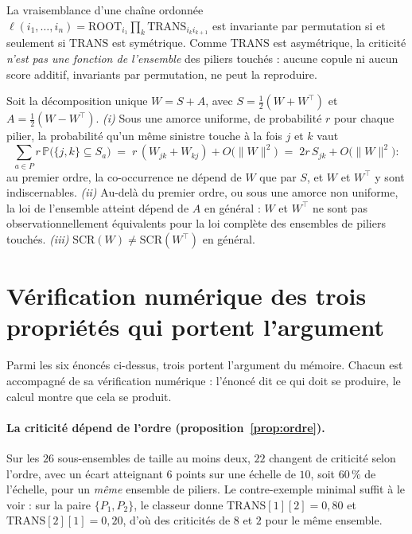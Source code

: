 \begin{proposition}
\label{prop:ordre}
La vraisemblance d'une chaîne ordonnée $\ell(i_1,\dots,i_n)=\mathrm{ROOT}_{i_1}\prod_k
\mathrm{TRANS}_{i_k i_{k+1}}$ est invariante par permutation si et seulement si
$\mathrm{TRANS}$ est symétrique. Comme $\mathrm{TRANS}$ est asymétrique, la criticité
\emph{n'est pas une fonction de l'ensemble} des piliers touchés : aucune copule ni aucun
score additif, invariants par permutation, ne peut la reproduire.
\end{proposition}

\begin{proposition}
\label{prop:nonid}
Soit la décomposition unique $W=S+A$, avec $S=\tfrac12(W+W^\top)$ et $A=\tfrac12(W-W^\top)$.
\emph{(i)} Sous une amorce uniforme, de probabilité $r$ pour chaque pilier, la probabilité qu'un
même sinistre touche à la fois $j$ et $k$ vaut
\[
  \sum_{a\in P} r\,\mathbb P\bigl(\{j,k\}\subseteq S_a\bigr)
  \;=\; r\,(W_{jk}+W_{kj})+O\bigl(\lVert W\rVert^2\bigr)
  \;=\; 2r\,S_{jk}+O\bigl(\lVert W\rVert^2\bigr) :
\]
au premier ordre, la co-occurrence ne dépend de $W$ que par $S$, et $W$ et $W^\top$ y sont
indiscernables. \emph{(ii)} Au-delà du premier ordre, ou sous une amorce non uniforme, la loi de
l'ensemble atteint dépend de $A$ en général : $W$ et $W^\top$ ne sont pas observationnellement
équivalents pour la loi complète des ensembles de piliers touchés. \emph{(iii)}
$\mathrm{SCR}(W)\neq\mathrm{SCR}(W^\top)$ en général.
\end{proposition}


\section{Vérification numérique des trois propriétés qui portent l'argument}
\label{sec:verif-proprietes}

Parmi les six énoncés ci-dessus, trois portent l'argument du mémoire. Chacun est accompagné de
sa vérification numérique : l'énoncé
dit ce qui doit se produire, le calcul montre que cela se produit.

\paragraph{La criticité dépend de l'ordre (proposition~\ref{prop:ordre}).} Sur les $26$
sous-ensembles de taille au moins deux, $22$ changent de criticité selon l'ordre, avec
un écart atteignant $6$ points sur une échelle de $10$, soit $60\,\%$ de l'échelle, pour
un \emph{même} ensemble de piliers. Le contre-exemple minimal suffit à le voir : sur la paire
$\{P_1,P_2\}$, le classeur donne $\mathrm{TRANS}[1][2]=0{,}80$ et $\mathrm{TRANS}[2][1]=0{,}20$,
d'où des criticités de $8$ et $2$ pour le même ensemble.

